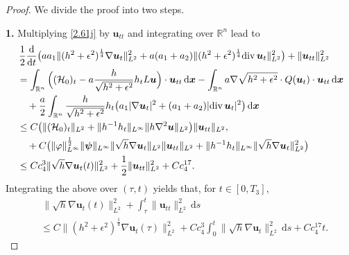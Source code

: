 \documentclass[11pt,reqno]{amsart}
\numberwithin{rk}{section}
\numberwithin{prop}{section}
\numberwithin{mydef}{section}
\numberwithin{lem}{section}
\numberwithin{equation}{section}
\numberwithin{thm}{section}
\begin{document}
\begin{proof}
We divide the proof into two steps.

\smallskip
\textbf{1.} Multiplying \eqref{2.61j} by $\boldsymbol{u}_{tt}$ and integrating over $\mathbb{R}^n$ lead to 
\begin{align*} 
&\begin{aligned}[b]
&\, \frac{1}{2}\frac{\mathrm{d}}{\mathrm{d}t}\big(aa_1\|(h^2+\epsilon^2)^{\frac{1}{4}}\nabla \boldsymbol{u}_t\|^2_{L^2}+a(a_1+a_2)\|(h^2+\epsilon^2)^{\frac{1}{4}}\mathrm{div}\,\boldsymbol{u}_t\|^2_{L^2}\big)+\|\boldsymbol{u}_{tt}\|_{L^2}^2\\
&=\int_{\mathbb{R}^n} \Big((\mathcal{H}_0)_t-a \frac{h}{\sqrt{h^2+\epsilon^2}} h_tL\boldsymbol{u}
\Big)\cdot \boldsymbol{u}_{tt}\,\mathrm{d}\boldsymbol{x} -\int_{\mathbb{R}^n} a\nabla\sqrt{h^2+\epsilon^2}\cdot Q(\boldsymbol{u}_t)\cdot \boldsymbol{u}_{tt}\,\mathrm{d}\boldsymbol{x}\\
&\quad +\frac{a}{2}\int_{\mathbb{R}^n} \frac{h}{\sqrt{h^2+\epsilon^2}}h_t\big(a_1|\nabla \boldsymbol{u}_t|^2+(a_1+a_2)|\mathrm{div}\, \boldsymbol{u}_t|^2\big)\,\mathrm{d}\boldsymbol{x}
\end{aligned}\\
&\begin{aligned}
&\leq C\big(\|(\mathcal{H}_0)_t\|_{L^2}+\|h^{-1}h_t\|_{L^\infty}\|h\nabla^2\boldsymbol{u}\|_{L^2}\big)\|\boldsymbol{u}_{tt}\|_{L^2},\\
&\quad +
C\big(\|\varphi\|^{\frac{1}{2}}_{L^\infty}\|\boldsymbol{\psi}\|_{L^\infty}\|\sqrt{h}\nabla \boldsymbol{u}_t\|_{L^2}\|\boldsymbol{u}_{tt}\|_{L^2}
+\|h^{-1}h_t\|_{L^\infty}\|\sqrt{h}\nabla \boldsymbol{u}_t\|^2_{L^2}\big)\notag\\
&\leq Cc^3_4\|\sqrt{h}\nabla \boldsymbol{u}_t(t)\|^2_{L^2}+\frac{1}{2}\|\boldsymbol{u}_{tt}\|^2_{L^2}+Cc^{17}_4.
\end{aligned}
\end{align*}
Integrating the above over $(\tau,t)$ yields that, for $t\in [0,T_3]$,
\begin{equation}\label{2.62b}
\begin{aligned}
&\,\|\sqrt{h}\nabla \boldsymbol{u}_t(t)\|^2_{L^2}+\int^t_\tau\|\boldsymbol{u}_{tt}\|^2_{L^2}\,\mathrm{d}s\\
&\leq C\|(h^2+\epsilon^2)^{\frac{1}{4}}\nabla \boldsymbol{u}_t(\tau)\|^2_{L^2}+Cc_4^3\int^t_0\|\sqrt{h}\nabla \boldsymbol{u}_t\|^2_{L^2}\,\mathrm{d}s +Cc_4^{17}t.
\end{aligned}
\end{equation}



\end{proof}
\end{document}

